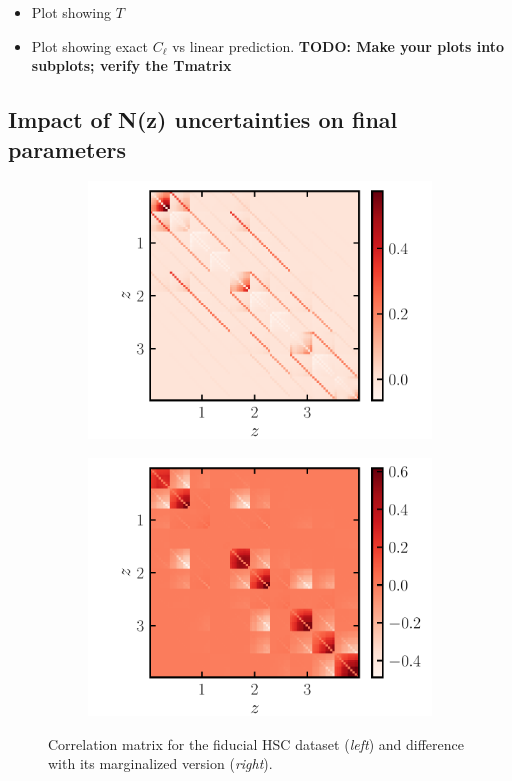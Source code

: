 \documentclass[a4paper,11pt]{article}
\newcommand{\todo}[1]{{\bf TODO: #1}}
\begin{document}
\begin{itemize}
  \item Plot showing $T$
  \item Plot showing exact $C_\ell$ vs linear prediction. \todo{Make your plots into subplots; verify the Tmatrix}
\end{itemize}{}
\subsection{Impact of N(z) uncertainties on final parameters}


\begin{figure}[ht]
\centering
\begin{subfigure}{.5\textwidth}
  \centering
  \includegraphics[width=1.\linewidth]{./corr_data}
  \label{fig:sub1}
\end{subfigure}%
\begin{subfigure}{.5\textwidth}
  \centering
  \includegraphics[width=1.\linewidth]{./corr_diff}
  \label{fig:sub2}
\end{subfigure}
\caption{Correlation matrix for the fiducial HSC dataset (\textit{left}) and difference with its marginalized version (\textit{right}).}
\label{fig:fid_marg_cov}
\end{figure}
\end{document}
